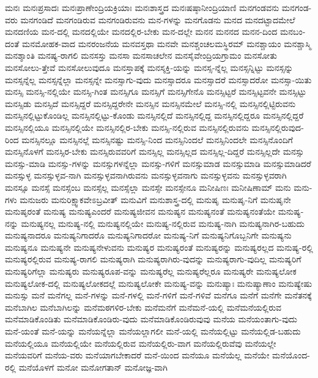 {ಮನಃ
ಮನಃಪ್ರಸಾದಃ
ಮನಃಪ್ರಾಣೇಂದ್ರಿಯಕ್ರಿಯಾಃ
ಮನಃಶಾಸ್ತ್ರದ
ಮನಃಷಷ್ಠಾನೀಂದ್ರಿಯಾಣಿ
ಮನಗಂಡವನು
ಮನಗಂಡ-ವರು
ಮನಗಂಡಿದೆ
ಮನಗಂಡಿರುವ
ಮನಗಂಡಿರುವನು
ಮನ-ಗಳನ್ನು
ಮನಗೊಡನು
ಮನದ
ಮನದಟ್ಟಾದಮೇಲೆ
ಮನದಣಿಯ
ಮನ-ದಲ್ಲಿ
ಮನದಲ್ಲಿಯೇ
ಮನದಲ್ಲಿರ-ಬೇಕು
ಮನ-ದಲ್ಲೇ
ಮನನ
ಮನನದ
ಮನನ-ದಿಂದ
ಮನಬಂ-ದಂತೆ
ಮನಮೋಹಕ-ವಾದ
ಮನರಂಜನೆಯ
ಮನವಸ್ತಥಾ
ಮನವೇ
ಮನಶ್ಚಂಚಲಮಸ್ಥಿರಮ್
ಮನಶ್ಚಾಯಂ
ಮನಶ್ಚಾಸ್ಮಿ
ಮನಶ್ಶಾಂತಿ
ಮನಷ್ಯ-ರಾಗಲಿ
ಮನಸಸ್ತು
ಮನಸಾ
ಮನಸಾಚಲೇನ
ಮನಸೈವೇಂದ್ರಿಯಗ್ರಾಮಂ
ಮನಸೋತು
ಮನಸೋಲು-ತ್ತೇವೆ
ಮನಸೋಲುವುದೂ
ಮನಸ್ತಾಪಕ್ಕೆ
ಮನಸ್ಶಕ್ತಿ-ಯನ್ನು
ಮನಸ್ಸ-ನ್ನೆಲ್ಲ
ಮನಸ್ಸನ್ನಿಟ್ಟು
ಮನಸ್ಸನ್ನು
ಮನಸ್ಸನ್ನೆಲ್ಲ
ಮನಸ್ಸನ್ನೆಲ್ಲಾ
ಮನಸ್ಸನ್ನೇ
ಮನಸ್ಸಾಗು-ವುದು
ಮನಸ್ಸಾದರೂ
ಮನಸ್ಸಾದರೆ
ಮನಸ್ಸಾದರೋ
ಮನಸ್ಸಾ-ಯಿತು
ಮನಸ್ಸಿ
ಮನಸ್ಸಿ-ನಲ್ಲಿಯೇ
ಮನಸ್ಸಿ-ಗಿಂತ
ಮನಸ್ಸಿಗೂ
ಮನಸ್ಸಿಗೆ
ಮನಸ್ಸಿಗೇನೊ
ಮನಸ್ಸಿಟ್ಟರೆ
ಮನಸ್ಸಿಟ್ಟವನೇ
ಮನಸ್ಸಿಟ್ಟು
ಮನಸ್ಸಿಡು
ಮನಸ್ಸಿದೆ
ಮನಸ್ಸಿದ್ದರೆ
ಮನಸ್ಸಿದ್ದರೇನೇ
ಮನಸ್ಸಿನ
ಮನಸ್ಸಿನಮೇಲೆ
ಮನಸ್ಸಿ-ನಲ್ಲಿ
ಮನಸ್ಸಿನಲ್ಲಿಟ್ಟಿರುವನು
ಮನಸ್ಸಿನಲ್ಲಿಟ್ಟುಕೊಂಡಿಲ್ಲ
ಮನಸ್ಸಿನಲ್ಲಿಟ್ಟು-ಕೊಂಡು
ಮನಸ್ಸಿನಲ್ಲಿದೆ
ಮನಸ್ಸಿನಲ್ಲಿದ್ದ
ಮನಸ್ಸಿನಲ್ಲಿದ್ದರೂ
ಮನಸ್ಸಿನಲ್ಲಿದ್ದರೆ
ಮನಸ್ಸಿನಲ್ಲಿಯೂ
ಮನಸ್ಸಿನಲ್ಲಿಯೇ
ಮನಸ್ಸಿನಲ್ಲಿರ-ಬೇಕು
ಮನಸ್ಸಿ-ನಲ್ಲಿರುವ
ಮನಸ್ಸಿನಲ್ಲಿರುವನು
ಮನಸ್ಸಿನಲ್ಲಿರುವುದ-ರಿಂದ
ಮನಸ್ಸಿನಲ್ಲೂ
ಮನಸ್ಸಿನಲ್ಲೆ
ಮನಸ್ಸಿನಷ್ಟು
ಮನಸ್ಸಿ-ನಿಂದ
ಮನಸ್ಸಿನಿಂದಲೆ
ಮನಸ್ಸಿನಿಂದಲೇ
ಮನಸ್ಸಿನೊಂದಿಗೆ
ಮನಸ್ಸಿನೊಳಗೆ
ಮನಸ್ಸಿರ-ಬೇಕು
ಮನಸ್ಸಿರುವವರಿಗೆ
ಮನಸ್ಸಿಲ್ಲ
ಮನಸ್ಸಿಲ್ಲದ
ಮನಸ್ಸಿಲ್ಲ-ದಿದ್ದರೆ
ಮನಸ್ಸಿಲ್ಲದೇ
ಮನಸ್ಸು
ಮನಸ್ಸು-ಮಾಡಿ
ಮನಸ್ಸು-ಗಳನ್ನು
ಮನಸ್ಸುಗಳನ್ನೆಲ್ಲಾ
ಮನಸ್ಸು-ಗಳಿಗೆ
ಮನಸ್ಸುಮಾಡ
ಮನಸ್ಸುಮಾಡಿ
ಮನಸ್ಸುಮಾಡಿದರೆ
ಮನಸ್ಸುಳ್ಳ
ಮನಸ್ಸುಳ್ಳವ-ನಾಗಿ
ಮನಸ್ಸುಳ್ಳವನಾಗಿರುವನು
ಮನಸ್ಸುಳ್ಳವನಾಗು
ಮನಸ್ಸುಳ್ಳವನು
ಮನಸ್ಸುಳ್ಳವರಾಗಿ
ಮನಸ್ಸೂ
ಮನಸ್ಸೆ
ಮನಸ್ಸೆಂಬ
ಮನಸ್ಸೆಲ್ಲ
ಮನಸ್ಸೆಲ್ಲಾ
ಮನಸ್ಸೇ
ಮನಸ್ಸೇನೂ
ಮನೀಷಿಣಃ
ಮನೀಷಿಣಾಮ್
ಮನು
ಮನು-ಗಳು
ಮನುಜರು
ಮನುರಿಕ್ಷ್ವಾಕವೇಽಬ್ರವೀತ್
ಮನುವಿಗೆ
ಮನುಶಾಸ್ತ್ರ-ದಲ್ಲಿ
ಮನುಷೃ
ಮನುಷೃ-ನಿಗೆ
ಮನುಷೃನೇ
ಮನುಷೃರಂತೆ
ಮನುಷ್ಯ
ಮನುಷ್ಯಎಂದರೆ
ಮನುಷ್ಯಜೀವನ
ಮನುಷ್ಯನ
ಮನುಷ್ಯನಂತೆ
ಮನುಷ್ಯನಂತೆಯೇ
ಮನುಷ್ಯ-ನನ್ನು
ಮನುಷ್ಯನಲ್ಲ
ಮನುಷ್ಯ-ನಲ್ಲಿ
ಮನುಷ್ಯನಲ್ಲಿಯೇ
ಮನುಷ್ಯ-ನಲ್ಲಿರುವ
ಮನುಷ್ಯ-ನಾಗಿ
ಮನುಷ್ಯನಾಗಿರ-ಬಹುದು
ಮನುಷ್ಯನಾದರೂ
ಮನುಷ್ಯನಿಗಾದರೊ
ಮನುಷ್ಯನಿಗಾದರೋ
ಮನುಷ್ಯ-ನಿಗೆ
ಮನುಷ್ಯನಿಗೊಬ್ಬನಿಗೇ
ಮನುಷ್ಯನು
ಮನುಷ್ಯನೂ
ಮನುಷ್ಯನೇ
ಮನುಷ್ಯನೇಳುವನು
ಮನುಷ್ಯರ
ಮನುಷ್ಯರಂತೆ
ಮನುಷ್ಯರನ್ನು
ಮನುಷ್ಯರಲ್ಲದ
ಮನುಷ್ಯ-ರಲ್ಲಿ
ಮನುಷ್ಯರಲ್ಲಿರುವ
ಮನುಷ್ಯ-ರಾಗಲಿ
ಮನುಷ್ಯರಾಗಿ
ಮನುಷ್ಯರಾಗಿರು-ವುದನ್ನು
ಮನುಷ್ಯರಾಗು-ವುದಿಲ್ಲ
ಮನುಷ್ಯರಿಗೆ
ಮನುಷ್ಯರಿಗೆಲ್ಲಾ
ಮನುಷ್ಯರು
ಮನುಷ್ಯರೂಪ-ವನ್ನು
ಮನುಷ್ಯರೆಲ್ಲ
ಮನುಷ್ಯರೆಲ್ಲರೂ
ಮನುಷ್ಯರೇ
ಮನುಷ್ಯಲೋಕ
ಮನುಷ್ಯಲೋಕ-ದಲ್ಲಿ
ಮನುಷ್ಯಲೋಕದಲ್ಲೆ
ಮನುಷ್ಯಲೋಕೇ
ಮನುಷ್ಯ-ವನ್ನು
ಮನುಷ್ಯಾಃ
ಮನುಷ್ಯಾಣಾಂ
ಮನುಷ್ಯೇಷು
ಮನುಸ್ಸು
ಮನೆ
ಮನೆಗಲ್ಲ
ಮನೆ-ಗಳನ್ನು
ಮನೆ-ಗಳಲ್ಲಿ
ಮನೆ-ಗಳಿಗೆ
ಮನೆ-ಗಳಿವೆ
ಮನೆಗೂ
ಮನೆಗೆ
ಮನೆಗೇ
ಮನೆತನಕ್ಕೆ
ಮನೆಬಾಗಿಲ
ಮನೆಬಾಗಿಲನ್ನು
ಮನೆಮಠಗಳಿರ-ಬೇಕು
ಮನೆಮನೆಗೆ
ಮನೆಮನೆ-ಯಲ್ಲಿ
ಮನೆಮನೆಯಲ್ಲಿರುವ
ಮನೆಮಾಡಿಕೊಂಡಿತು
ಮನೆಮಾಡಿಕೊಂಡಿರು-ವುದು
ಮನೆಮಾಡಿಕೊಂಡಿರುವುವು
ಮನೆಯ
ಮನೆಯಂತಾಗು-ವುದು
ಮನೆ-ಯಂತೆ
ಮನೆ-ಯನ್ನು
ಮನೆಯನ್ನೆಲ್ಲಾ
ಮನೆಯಲ್ಲಾಗಲೀ
ಮನೆ-ಯಲ್ಲಿ
ಮನೆಯಲ್ಲಿಟ್ಟು
ಮನೆಯಲ್ಲಿಡ-ಬಹುದು
ಮನೆಯಲ್ಲಿಯೂ
ಮನೆಯಲ್ಲಿಯೇ
ಮನೆಯಲ್ಲಿರುವ
ಮನೆಯಲ್ಲಿರು-ವಾಗ
ಮನೆಯಲ್ಲಿರುವೆವು
ಮನೆಯಲ್ಲೇ
ಮನೆಯವರಿಗೆ
ಮನೆಯ-ವರು
ಮನೆಯಾಗಬೇಕಾದರೆ
ಮನೆ-ಯಿಂದ
ಮನೆಯೂ
ಮನೆಯೆಲ್ಲ
ಮನೆಯೇ
ಮನೆಯೊಂದ-ರಲ್ಲಿ
ಮನೆಯೊಳಗೆ
ಮನೋ
ಮನೋಗತಾನ್
ಮನೋಜ್ಞ-ವಾಗಿ
}
